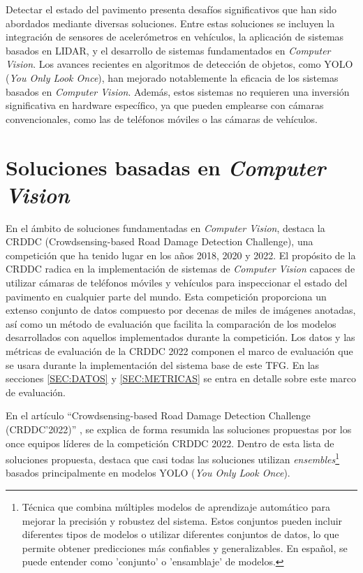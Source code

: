 
Detectar el estado del pavimento presenta desafíos significativos que han sido abordados mediante diversas soluciones. Entre estas soluciones se incluyen la integración de sensores de acelerómetros en vehículos\cite{Pavement_Anomalies_Accelerometer}, la aplicación de sistemas basados en LIDAR\cite{LIDAR_Blasiis}\cite{LIDAR_VanDerHorst}, y el desarrollo de sistemas fundamentados en \textit{Computer Vision}. Los avances recientes en algoritmos de detección de objetos, como YOLO (\textit{You Only Look Once}), han mejorado notablemente la eficacia de los sistemas basados en \textit{Computer Vision}. Además, estos sistemas no requieren una inversión significativa en hardware específico, ya que pueden emplearse con cámaras convencionales, como las de teléfonos móviles o las cámaras de vehículos.

\section{Soluciones basadas en \textit{Computer Vision}}
En el ámbito de soluciones fundamentadas en \textit{Computer Vision}, destaca la CRDDC (Crowdsensing-based Road Damage Detection Challenge), una competición que ha tenido lugar en los años 2018, 2020 y 2022. El propósito de la CRDDC radica en la implementación de sistemas de \textit{Computer Vision} capaces de utilizar cámaras de teléfonos móviles y vehículos para inspeccionar el estado del pavimento en cualquier parte del mundo. Esta competición proporciona un extenso conjunto de datos compuesto por decenas de miles de imágenes anotadas, así como un método de evaluación que facilita la comparación de los modelos desarrollados con aquellos implementados durante la competición. Los datos y las métricas de evaluación de la CRDDC 2022 componen el marco de evaluación que se usara durante la implementación del sistema base de este TFG. En las secciones \ref{SEC:DATOS} y \ref{SEC:METRICAS} se entra en detalle sobre este marco de evaluación.

En el artículo “Crowdsensing-based Road Damage Detection Challenge (CRDDC’2022)” \cite{CRDDC2022_paper}, se explica de forma resumida las soluciones propuestas por los once equipos líderes de la competición CRDDC 2022. Dentro de esta lista de soluciones propuesta, destaca que casi todas las soluciones utilizan \textit{ensembles}\footnote{Técnica que combina múltiples modelos de aprendizaje automático para mejorar la precisión y robustez del sistema. Estos conjuntos pueden incluir diferentes tipos de modelos o utilizar diferentes conjuntos de datos, lo que permite obtener predicciones más confiables y generalizables. En español, se puede entender como 'conjunto' o 'ensamblaje' de modelos.} basados principalmente en modelos YOLO (\textit{You Only Look Once}). 

